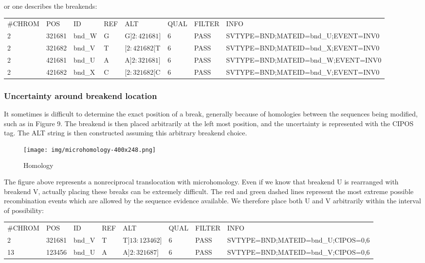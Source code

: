 \documentclass[8pt]{article}
\begin{document}
or one describes the breakends:

\vspace{0.3cm}
\footnotesize
\begin{tabular}{ l l l l l l l l }
\#CHROM & POS & ID & REF & ALT & QUAL & FILTER & INFO \\
2 & 321681 & bnd\_W & G & G$]2:421681]$ & 6 & PASS & SVTYPE=BND;MATEID=bnd\_U;EVENT=INV0 \\
2 & 321682 & bnd\_V & T & $[2:421682[$T & 6 & PASS & SVTYPE=BND;MATEID=bnd\_X;EVENT=INV0 \\
2 & 421681 & bnd\_U & A & A$]2:321681]$ & 6 & PASS & SVTYPE=BND;MATEID=bnd\_W;EVENT=INV0 \\
2 & 421682 & bnd\_X & C & $[2:321682[$C & 6 & PASS & SVTYPE=BND;MATEID=bnd\_V;EVENT=INV0 \\
\end{tabular}
\normalsize

\subsubsection{Uncertainty around breakend location}
It sometimes is difficult to determine the exact position of a break, generally because of homologies between the sequences being modified, such as in Figure 9.
The breakend is then placed arbitrarily at the left most position, and the uncertainty is represented with the CIPOS tag.
The ALT string is then constructed assuming this arbitrary breakend choice.

\begin{figure}[ht]
\centering
\texttt{[image: img/microhomology-400x248.png]}
\caption{Homology}
\end{figure}

The figure above represents a nonreciprocal translocation with microhomology.
Even if we know that breakend U is rearranged with breakend V, actually placing these breaks can be extremely difficult.
The red and green dashed lines represent the most extreme possible recombination events which are allowed by the sequence evidence available.
We therefore place both U and V arbitrarily within the interval of possibility:

\vspace{0.3cm}
\footnotesize
\begin{tabular}{ l l l l l l l l }
\#CHROM & POS & ID & REF & ALT & QUAL & FILTER & INFO \\
2 & 321681 & bnd\_V & T & T$]13:123462]$ & 6 & PASS & SVTYPE=BND;MATEID=bnd\_U;CIPOS=0,6 \\
13 & 123456 & bnd\_U & A & A$]2:321687]$ & 6 & PASS & SVTYPE=BND;MATEID=bnd\_V;CIPOS=0,6 \\
\end{tabular}
\normalsize
\vspace{0.3cm}
\end{document}
